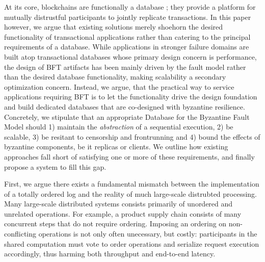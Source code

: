 At its core, blockchains are functionally a database ; they provide a platform for mutually distrustful participants to jointly replicate transactions.
In this paper however, we argue that existing solutions merely shoehorn the desired functionality of transactional applications rather than catering to the principal requirements of a database. 
While applications in stronger failure domains  are built atop transactional databases whose primary design concern is performance, the design of BFT artifacts has been mainly driven by the fault model rather than the desired database functionality, making scalability a secondary optimization concern. 
Instead, we argue, that the practical  way to service applications requiring BFT is to let the functionality drive the design foundation and build dedicated databases that are co-designed with byzantine resilience. 
Concretely, we stipulate that an appropriate Database for the Byzantine Fault Model should 1) maintain the \textit{abstraction} of a sequential execution, 2) be scalable, 3) be resitant to censorship and frontrunning and 4) bound the effects of byzantine components, be it replicas or clients.
We outline how existing approaches fall short of satisfying one or more of these requirements, and finally propose a system to fill this gap.

\iffalse
{}
First, we argue there exists a fundamental mismatch between the implementation of a totally ordered log and the reality of much large-scale distrubted processing. Many large-scale distributed systems consists primarily of unordered and unrelated operations. For example, a product supply chain consists of many concurrent steps that do not require ordering. Imposing an ordering on non-conflicting operations is not only often unecessary, but costly: participants in the shared computation must vote to order operations and serialize request execution accordingly, thus harming both throughput and end-to-end latency. \\

